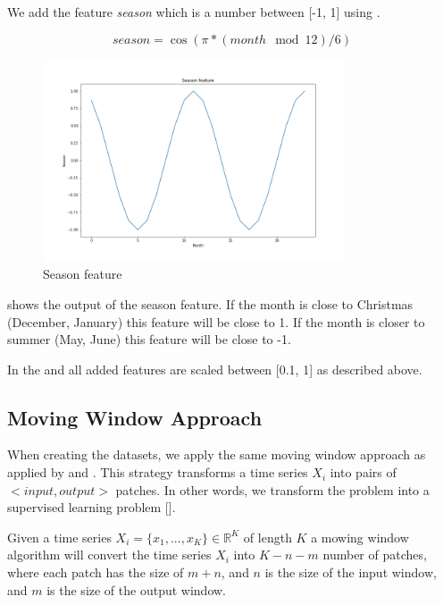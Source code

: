 We add the feature \textit{season} which is a number between [-1, 1] using .

\begin{equation}
  season = \cos(\pi * (month \mod{12}) / 6)
  \label{eq:season_feature}
\end{equation}

\begin{figure}[h!]
  \centering
  \includegraphics[width=0.8\textwidth]{./figs/code_generated/season_feature.png}
  \hfill
  \caption{Season feature}
  \label{fig:season-feature}
\end{figure}

 shows the output of the season feature.
If the month is close to Christmas (December, January) this feature will be close to 1.
If the month is closer to summer (May, June) this feature will be close to -1.

In the and all added features are scaled between [0.1, 1] as described above.


\subsection{Moving Window Approach}
\label{section:Data:Preprocessing:moving-window-approach}
When creating the datasets, we apply the same moving window approach as applied by \cite{Bandara2019} and \cite{Hewamalage2021}.
This strategy transforms a time series $X_i$ into pairs of $<input, output>$ patches.
In other words, we transform the problem into a supervised learning problem [].

Given a time series $X_i = \{x_1, ..., x_K\} \in \mathbb{R}^K$ of length $K$ a mowing
window algorithm will convert the time series $X_i$ into $K-n-m$ number of patches,
where each patch has the size of $m+n$, and $n$ is the size of the input window,
and $m$ is the size of the output window.

